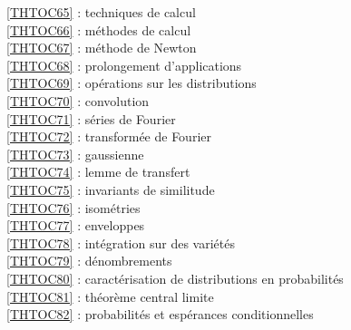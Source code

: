\ref {THTOC65} : techniques de calcul\\
\ref {THTOC66} : méthodes de calcul\\
\ref {THTOC67} : méthode de Newton\\
\ref {THTOC68} : prolongement d'applications\\
\ref {THTOC69} : opérations sur les distributions\\
\ref {THTOC70} : convolution\\
\ref {THTOC71} : séries de Fourier\\
\ref {THTOC72} : transformée de Fourier\\
\ref {THTOC73} : gaussienne\\
\ref {THTOC74} : lemme de transfert\\
\ref {THTOC75} : invariants de similitude\\
\ref {THTOC76} : isométries\\
\ref {THTOC77} : enveloppes\\
\ref {THTOC78} : intégration sur des variétés\\
\ref {THTOC79} : dénombrements\\
\ref {THTOC80} : caractérisation de distributions en probabilités\\
\ref {THTOC81} : théorème central limite\\
\ref {THTOC82} : probabilités et espérances conditionnelles\\
